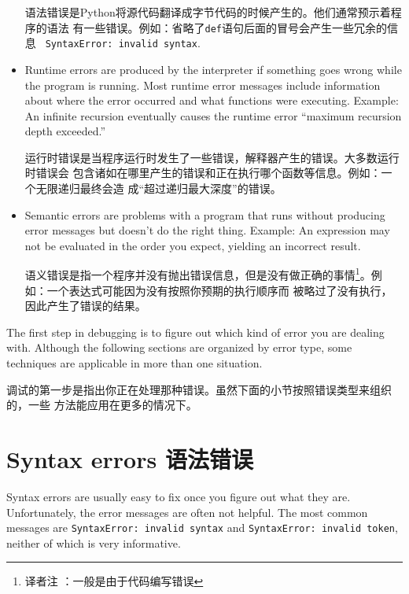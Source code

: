 \documentclass[10pt]{book}
\begin{document}
\begin{CJK}{UTF8}{gbsn}
\begin{itemize}
  语法错误是Python将源代码翻译成字节代码的时候产生的。他们通常预示着程序的语法
  有一些错误。例如：省略了{\tt def}语句后面的冒号会产生一些冗余的信息 {\tt
  SyntaxError: invalid syntax}.

\item Runtime errors are produced by the interpreter if something goes
  wrong while the program is running.  Most runtime error messages
  include information about where the error occurred and what
  functions were executing.  Example: An infinite recursion eventually
  causes the runtime error ``maximum recursion depth exceeded.''

  运行时错误是当程序运行时发生了一些错误，解释器产生的错误。大多数运行时错误会
  包含诸如在哪里产生的错误和正在执行哪个函数等信息。例如：一个无限递归最终会造
  成``超过递归最大深度''的错误。

\item Semantic errors are problems with a program that runs without
  producing error messages but doesn't do the right thing.  Example:
  An expression may not be evaluated in the order you expect, yielding
  an incorrect result.

  语义错误是指一个程序并没有抛出错误信息，但是没有做正确的事情\footnote{译者注
  ：一般是由于代码编写错误}。例如：一个表达式可能因为没有按照你预期的执行顺序而
  被略过了没有执行，因此产生了错误的结果。

\end{itemize}

The first step in debugging is to figure out which kind of
error you are dealing with.  Although the following sections are
organized by error type, some techniques are
applicable in more than one situation.

调试的第一步是指出你正在处理那种错误。虽然下面的小节按照错误类型来组织的，一些
方法能应用在更多的情况下。

\section{Syntax errors 语法错误}

Syntax errors are usually easy to fix once you figure out what they
are.  Unfortunately, the error messages are often not helpful.
The most common messages are {\tt SyntaxError: invalid syntax} and
{\tt SyntaxError: invalid token}, neither of which is very informative.


\end{CJK}
\end{document}

